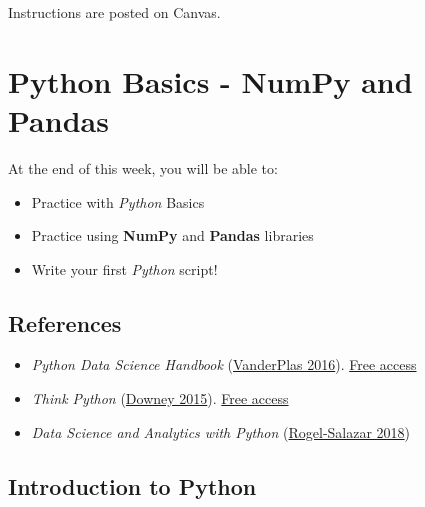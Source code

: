 \documentclass[
  letterpaper,
  DIV=11,
  numbers=noendperiod]{scrreprt}
\providecommand{\tightlist}{%
  \setlength{\itemsep}{0pt}\setlength{\parskip}{0pt}}\usepackage{longtable,booktabs,array}
\begin{document}

Instructions are posted on Canvas.

\hypertarget{python-basics---numpy-and-pandas}{%
\chapter*{Python Basics - NumPy and
Pandas}\label{python-basics---numpy-and-pandas}}


At the end of this week, you will be able to:

\begin{itemize}
\tightlist
\item
  Practice with \emph{Python} Basics
\item
  Practice using \textbf{NumPy} and \textbf{Pandas} libraries
\item
  Write your first \emph{Python} script!
\end{itemize}

\hypertarget{references}{%
\section*{References}\label{references}}


\begin{itemize}
\tightlist
\item
  \emph{Python Data Science Handbook}
  (\protect\hyperlink{ref-Jake2016python}{VanderPlas 2016}).
  \href{https://jakevdp.github.io/PythonDataScienceHandbook/00.00-preface.html}{Free
  access}
\item
  \emph{Think Python} (\protect\hyperlink{ref-Allenpython}{Downey
  2015}).
  \href{https://greenteapress.com/thinkpython2/thinkpython2.pdf}{Free
  access}
\item
  \emph{Data Science and Analytics with Python}
  (\protect\hyperlink{ref-rogel2018data}{Rogel-Salazar 2018})
\end{itemize}

\hypertarget{introduction-to-python}{%
\section*{Introduction to Python}\label{introduction-to-python}}
\end{document}

